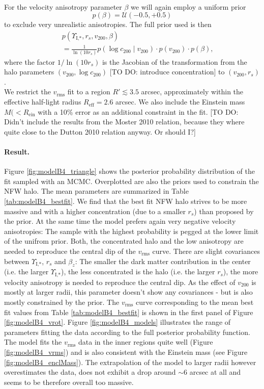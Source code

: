 \\For the velocity anisotropy parameter $\beta$ we will again employ a uniform prior 
\begin{equation*}
p(\beta) = \mathscr{U}(-0.5,+0.5)
\end{equation*}
to exclude very unrealistic anisotropies. The full prior used is then
\begin{eqnarray*}
&&p(\Upsilon_\text{I,*},r_s,v_{200},\beta) \\
&&= \frac{1}{\ln\left( 10 r_s\right)} p(\log c_{200} \mid v_{200}) \cdot p(v_{200}) \cdot p(\beta), 
\end{eqnarray*}
where the factor $1/\ln\left( 10 r_s\right)$ is the Jacobian of the transformation from the halo parameters $(v_{200},\log c_{200})$ [TO DO: introduce concentration] to $(v_{200},r_s)$.
\\We restrict the $v_\text{rms}$ fit to a region $R' \lesssim 3.5$ arcsec, approximately within the effective half-light radius $R_\text{eff} = 2.6$ arcsec. We also include the Einstein mass $M(<R_\text{ein}$ with a 10\% error as an additional constraint in the fit. [TO DO: Didn't include the results from the Moster 2010 relation, because they where quite close to the Dutton 2010 relation anyway. Or should I?]


\paragraph{Result.} Figure \ref{fig:modelB4_triangle} shows the posterior probability distribution of the fit sampled with an MCMC. Overplotted are also the priors used to constrain the NFW halo. The mean parameters are summarized in Table \ref{tab:modelB4_bestfit}. We find that the best fit NFW halo strives to be more massive and with a higher concentration (due to a smaller $r_s$) than  proposed by the prior. At the same time the model prefers again very negative velocity anisotropies: The sample with the highest probability is pegged at the lower limit of the unifrom prior. Both, the concentrated halo and the low anisotropy are needed to reproduce the central dip of the $v_\text{rms}$ curve. There are slight covariances between $\Upsilon_\text{I,*}$,  $r_s$ and $\beta_z$: The smaller the dark matter contribution in the center (i.e. the larger $\Upsilon_\text{I,*}$), the less concentrated is the halo (i.e. the larger $r_s$), the more velocity anisotropy is needed to reproduce the central dip. As the effect of $v_{200}$ is mostly at larger radii, this parameter doesn't show any covariances - but is also mostly constrained by the prior. The $v_\text{rms}$ curve corresponding to the mean best fit values from Table \ref{tab:modelB4_bestfit} is shown in the first panel of Figure \ref{fig:modelB4_vrot}. Figure \ref{fig:modelB4_models} illustrates the range of parameters fitting the data according to the full posterior probability function. The model fits the $v_\text{rms}$ data in the inner regions quite well (Figure \ref{fig:modelB4_vrms}) and is also consistent with the Einstein mass (see Figure \ref{fig:modelB4_enclMass}). The extrapolation of the model to larger radii however overestimates the data, does not exhibit a drop around $\sim 6$ arcsec at all and seems to be therefore overall too massive.\\

